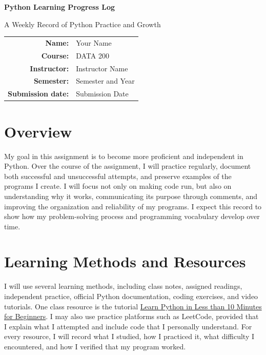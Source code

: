 \documentclass[12pt]{article}
\newcommand{\studentname}{Your Name}
\newcommand{\coursename}{DATA 200}
\newcommand{\assignmentname}{Python Learning Progress Log}
\newcommand{\instructorname}{Instructor Name}
\newcommand{\semestername}{Semester and Year}
\newcommand{\submissiondate}{Submission Date}
\begin{document}
\begin{titlepage}
  \centering
  \vspace*{1.2in}
  {\Huge\bfseries \assignmentname\par}
  \vspace{0.35in}
  {\Large A Weekly Record of Python Practice and Growth\par}
  \vfill
  \begin{tabular}{rl}
    \textbf{Name:} & \studentname \\
    \textbf{Course:} & \coursename \\
    \textbf{Instructor:} & \instructorname \\
    \textbf{Semester:} & \semestername \\
    \textbf{Submission date:} & \submissiondate
  \end{tabular}
  \vfill
\end{titlepage}

\tableofcontents
\clearpage

\section{Overview}
My goal in this assignment is to become more proficient and independent in Python. Over the course of the assignment, I will practice regularly, document both successful and unsuccessful attempts, and preserve examples of the programs I create. I will focus not only on making code run, but also on understanding why it works, communicating its purpose through comments, and improving the organization and reliability of my programs. I expect this record to show how my problem-solving process and programming vocabulary develop over time.

\section{Learning Methods and Resources}
I will use several learning methods, including class notes, assigned readings, independent practice, official Python documentation, coding exercises, and video tutorials. One class resource is the tutorial \href{https://www.youtube.com/watch?v=fWjsdhR3z3c}{Learn Python in Less than 10 Minutes for Beginners}. I may also use practice platforms such as LeetCode, provided that I explain what I attempted and include code that I personally understand. For every resource, I will record what I studied, how I practiced it, what difficulty I encountered, and how I verified that my program worked.
\end{document}
